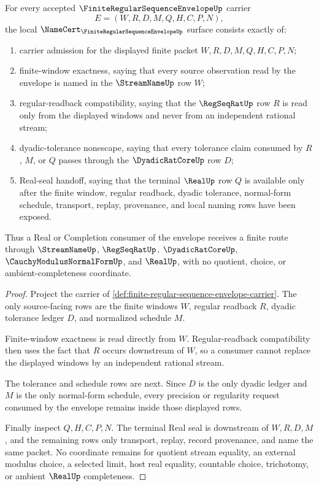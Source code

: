 \begin{theorem}
\label{thm:finite-regular-sequence-envelope-namecert-obligations}
For every accepted $\FiniteRegularSequenceEnvelopeUp$ carrier
$$
E=(W,R,D,M,Q,H,C,P,N),
$$
the local $\NameCert_{\FiniteRegularSequenceEnvelopeUp}$ surface consists exactly of:
\begin{enumerate}
\item carrier admission for the displayed finite packet $W,R,D,M,Q,H,C,P,N$;
\item finite-window exactness, saying that every source observation read by the envelope is named in the $\StreamNameUp$ row $W$;
\item regular-readback compatibility, saying that the $\RegSeqRatUp$ row $R$ is read only from the displayed windows and never from an independent rational stream;
\item dyadic-tolerance nonescape, saying that every tolerance claim consumed by $R$, $M$, or $Q$ passes through the $\DyadicRatCoreUp$ row $D$;
\item Real-seal handoff, saying that the terminal $\RealUp$ row $Q$ is available only after the finite window, regular readback, dyadic tolerance, normal-form schedule, transport, replay, provenance, and local naming rows have been exposed.
\end{enumerate}
Thus a Real or Completion consumer of the envelope receives a finite route through $\StreamNameUp$, $\RegSeqRatUp$, $\DyadicRatCoreUp$, $\CauchyModulusNormalFormUp$, and $\RealUp$, with no quotient, choice, or ambient-completeness coordinate.
\end{theorem}
\begin{proof}
Project the carrier of \autoref{def:finite-regular-sequence-envelope-carrier}. The only source-facing rows are the finite windows $W$, regular readback $R$, dyadic tolerance ledger $D$, and normalized schedule $M$.

Finite-window exactness is read directly from $W$. Regular-readback compatibility then uses the fact that $R$ occurs downstream of $W$, so a consumer cannot replace the displayed windows by an independent rational stream.

The tolerance and schedule rows are next. Since $D$ is the only dyadic ledger and $M$ is the only normal-form schedule, every precision or regularity request consumed by the envelope remains inside those displayed rows.

Finally inspect $Q,H,C,P,N$. The terminal Real seal is downstream of $W,R,D,M$, and the remaining rows only transport, replay, record provenance, and name the same packet. No coordinate remains for quotient stream equality, an external modulus choice, a selected limit, host real equality, countable choice, trichotomy, or ambient $\RealUp$ completeness.
\end{proof}

